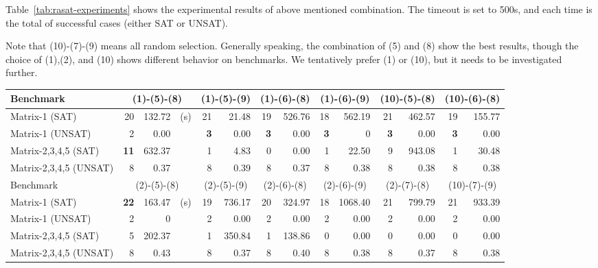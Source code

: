 Table~\ref{tab:rasat-experiments} shows the experimental results of above mentioned combination. 
The timeout is set to 500s, and each time is the total of successful cases 
(either SAT or UNSAT). 

Note that (10)-(7)-(9) means all random selection. 
Generally speaking, the combination of (5) and (8) show the best results, 
though the choice of (1),(2), and (10) shows different behavior on benchmarks. 
We tentatively prefer (1) or (10), but it needs to be investigated further. 

\begin{table*}[t]
\centering
\begin{tabular}{ | l | r | r  r | r | r  | r | r | r | r | r | r |r | r |}
\hline
    \multicolumn{1}{|l|}{Benchmark} & 
    \multicolumn{3}{c|}{(1)-(5)-(8)} & \multicolumn{2}{c|}{(1)-(5)-(9)} & 
    \multicolumn{2}{c|}{(1)-(6)-(8)} & \multicolumn{2}{c|}{(1)-(6)-(9)} &
    \multicolumn{2}{c|}{(10)-(5)-(8)} & \multicolumn{2}{c|}{(10)-(6)-(8)} 
\\
\hline
 Matrix-1 (SAT) & 20 & 132.72 & (s) & 21 & 21.48 & 19 & 526.76 & 18 & 562.19 & 21 & 462.57 & 19 & 155.77 
\\
\hline
 Matrix-1 (UNSAT) & 2 & 0.00 && {\bf 3} & 0.00 & {\bf 3} & 0.00 & {\bf 3} & 0 & {\bf 3} & 0.00 
& {\bf 3} & 0.00 
\\
\hline
 Matrix-2,3,4,5 (SAT) & {\bf 11} & 632.37 && 1 & 4.83 & 0 & 0.00 & 1 & 22.50 & 9 & 943.08 & 1 & 30.48 
\\
\hline
 Matrix-2,3,4,5 (UNSAT) & 8 & 0.37 && 8 & 0.39 & 8 & 0.37 & 8 & 0.38 & 8 & 0.38 & 8 & 0.38 
\\
\hline
\hline
    \multicolumn{1}{|l|}{Benchmark} & 
    \multicolumn{3}{c|}{(2)-(5)-(8)} & \multicolumn{2}{c|}{(2)-(5)-(9)} & 
    \multicolumn{2}{c|}{(2)-(6)-(8)} & \multicolumn{2}{c|}{(2)-(6)-(9)} & 
    \multicolumn{2}{c|}{(2)-(7)-(8)} & \multicolumn{2}{c|}{(10)-(7)-(9)} \\
\hline
 Matrix-1 (SAT) & {\bf 22} & 163.47 & (s) & 19 & 736.17 & 20 & 324.97 & 18 & 
1068.40 & 21 & 799.79 & 21 & 933.39 
\\
\hline
 Matrix-1 (UNSAT) &     2 & 0 && 2 & 0.00 & 2 & 0.00 & 2 & 0.00 & 2 & 0.00 & 2 & 0.00 
\\
\hline
 Matrix-2,3,4,5 (SAT) &     5 & 202.37 && 1 & 350.84 & 1 & 138.86 & 0 & 0.00 & 0 & 0.00 & 0 & 0.00 
\\
\hline
 Matrix-2,3,4,5 (UNSAT) &     8 & 0.43 && 8 & 0.37 & 8 & 0.40 & 8 & 0.38 & 8 & 0.37 & 8 & 0.38 
\\
\hline

\end{tabular}
\end{table*}
